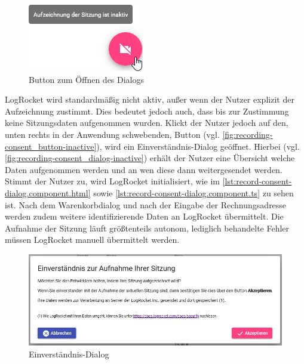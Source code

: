 \begin{figure}
\centering
\includegraphics[width=\linewidth]{img/04_erstellung-poc/implementierung_frontend_recording-consent_button-inactive.png}
\caption{Button zum Öffnen des Dialogs}
\label{fig:recording-consent_button-inactive}
\end{figure}

LogRocket wird standardmäßig nicht aktiv, außer wenn der Nutzer explizit der Aufzeichnung zustimmt. Dies bedeutet jedoch auch, dass bis zur Zustimmung keine Sitzungsdaten aufgenommen wurden. Klickt der Nutzer jedoch auf den, unten rechts in der Anwendung schwebenden, Button (vgl. \autoref{fig:recording-consent_button-inactive}), wird ein Einverständnis-Dialog geöffnet. Hierbei (vgl. \autoref{fig:recording-consent_dialog-inactive}) erhält der Nutzer eine Übersicht welche Daten aufgenommen werden und an wen diese dann weitergesendet werden. Stimmt der Nutzer zu, wird LogRocket initialisiert, wie im \autoref{lst:record-consent-dialog.component.html} sowie \autoref{lst:record-consent-dialog.component.ts} zu sehen ist. Nach dem Warenkorbdialog und nach der Eingabe der Rechnungsadresse werden zudem weitere identifizierende Daten an LogRocket übermittelt. Die Aufnahme der Sitzung läuft größtenteils autonom, lediglich behandelte Fehler müssen LogRocket manuell übermittelt werden.
	
\begin{figure}[H]
	\centering
	\includegraphics[width=1.00\linewidth]{img/04_erstellung-poc/implementierung_frontend_recording-consent_dialog-inactive.png}
	\caption{Einverständnis-Dialog}
	\label{fig:recording-consent_dialog-inactive}
\end{figure}

